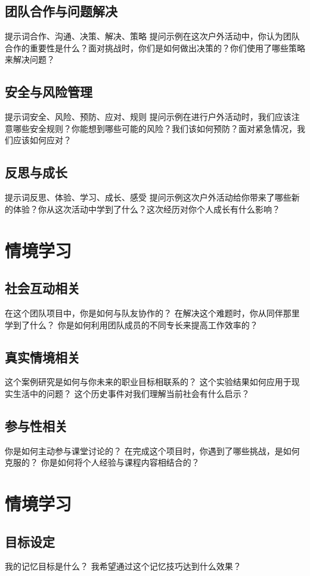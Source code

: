 \documentclass[12pt]{book}
\begin{document}
\subsection{团队合作与问题解决}
提示词合作、沟通、决策、解决、策略
提问示例在这次户外活动中，你认为团队合作的重要性是什么？面对挑战时，你们是如何做出决策的？你们使用了哪些策略来解决问题？

\subsection{安全与风险管理}
提示词安全、风险、预防、应对、规则
提问示例在进行户外活动时，我们应该注意哪些安全规则？你能想到哪些可能的风险？我们该如何预防？面对紧急情况，我们应该如何应对？

\subsection{反思与成长}
提示词反思、体验、学习、成长、感受
提问示例这次户外活动给你带来了哪些新的体验？你从这次活动中学到了什么？这次经历对你个人成长有什么影响？


\section{情境学习}
\subsection{社会互动相关}
在这个团队项目中，你是如何与队友协作的？
在解决这个难题时，你从同伴那里学到了什么？
你是如何利用团队成员的不同专长来提高工作效率的？

\subsection{真实情境相关}
这个案例研究是如何与你未来的职业目标相联系的？
这个实验结果如何应用于现实生活中的问题？
这个历史事件对我们理解当前社会有什么启示？

\subsection{参与性相关}
你是如何主动参与课堂讨论的？
在完成这个项目时，你遇到了哪些挑战，是如何克服的？
你是如何将个人经验与课程内容相结合的？


\section{情境学习}
\subsection{目标设定}
我的记忆目标是什么？
我希望通过这个记忆技巧达到什么效果？
\end{document}
